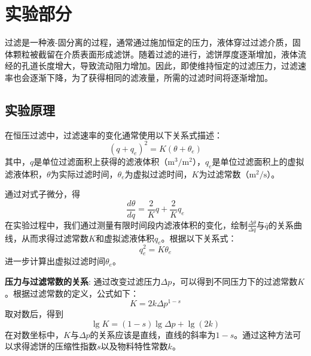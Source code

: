 
\section{实验部分}


过滤是一种液-固分离的过程，通常通过施加恒定的压力，液体穿过过滤介质，固体颗粒被截留在介质表面形成滤饼。随着过滤的进行，滤饼厚度逐渐增加，液体流经的孔道长度增大，导致流动阻力增加。因此，即使维持恒定的过滤压力，过滤速率也会逐渐下降，为了获得相同的滤液量，所需的过滤时间将逐渐增加。

\subsection{实验原理}


在恒压过滤中，过滤速率的变化通常使用以下关系式描述：
\begin{equation}
(q + q_{e})^2 = K (\theta + \theta_{e})
\end{equation}
其中，$q$是单位过滤面积上获得的滤液体积（$\mathrm{m}^3/\mathrm{m}^2$），$q_{e}$是单位过滤面积上的虚拟滤液体积，$\theta$为实际过滤时间，$\theta_{e}$为虚拟过滤时间，$K$为过滤常数（$\mathrm{m}^2/\mathrm{s}$）。

通过对式子微分，得
\begin{equation}
\frac{d\theta}{dq} = \frac{2}{K} q + \frac{2}{K} q_{e}
\end{equation}
在实验过程中，我们通过测量有限时间段内滤液体积的变化，绘制$\frac{\Delta \theta}{\Delta q}$与$\bar{q}$的关系曲线，从而求得过滤常数$K$和虚拟滤液体积$q_{e}$。根据以下关系式：
\begin{equation}
q_{e}^2 = K\theta_{e}
\end{equation}
进一步计算出虚拟过滤时间$\theta_{e}$。

\textbf{压力与过滤常数的关系}:
通过改变过滤压力$\Delta p$，可以得到不同压力下的过滤常数$K$。根据过滤常数的定义，公式如下：
\begin{equation}
K = 2k\Delta p^{1-s}
\end{equation}
取对数后，得到
\begin{equation}
\lg K = (1 - s)\lg \Delta p + \lg(2k)
\end{equation}
在对数坐标中，$K$与$\Delta p$的关系应该是直线，直线的斜率为$1-s$。通过这种方法可以求得滤饼的压缩性指数$s$以及物料特性常数$k$。

